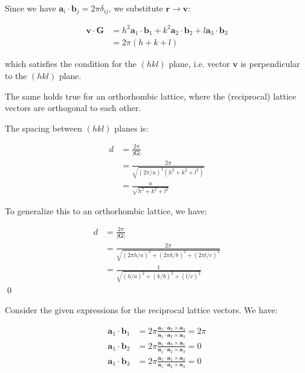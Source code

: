 \documentclass[12pt]{article}
\begin{document}
Since we have $\mathbf{a}_{i} \cdot \mathbf{b}_{j} = 2\pi \delta_{ij}$, we substitute $\mathbf{r} \to \mathbf{v}$:

\begin{equation}
    \begin{split}
        \mathbf{v} \cdot \mathbf{G} & = h^{2} \mathbf{a}_{1} \cdot \mathbf{b}_{1} + k^{2} \mathbf{a}_{2} \cdot \mathbf{b}_{2} + l \mathbf{a}_{3} \cdot \mathbf{b}_{3} \\
        & = 2\pi (h + k + l)
    \end{split}
\end{equation}

which satisfies the condition for the $(hkl)$ plane, i.e. vector $\mathbf{v}$ is perpendicular to the $(hkl)$ plane.

The same holds true for an orthorhombic lattice, where the (reciprocal) lattice vectors are orthogonal to each other.

The spacing between $(hkl)$ planes is:

\begin{equation}
    \begin{split}
        d &= \frac{2\pi}{\left\lvert \mathbf{G} \right\rvert} \\
        &= \frac{2\pi}{\sqrt{(2\pi/a)^{2} (h^{2} + k^{2} + l^{2})}} \\
        &= \frac{a}{\sqrt{h^{2} + k^{2} + l^{2}}}
    \end{split}
\end{equation}

To generalize this to an orthorhombic lattice, we have:

\begin{equation}
    \begin{split}
        d &= \frac{2\pi}{\left\lvert \mathbf{G} \right\rvert} \\
        &= \frac{2\pi}{\sqrt{(2\pi h/a)^{2} + (2\pi k/b)^{2} + (2\pi l/c)^{2}}} \\
        &= \frac{1}{\sqrt{(h/a)^{2} + (k/b)^{2} + (l/c)^{2}}}
    \end{split}
\end{equation}
\qed




Consider the given expressions for the reciprocal lattice vectors. We have:

\begin{equation}
    \begin{split}
        \mathbf{a}_{1} \cdot \mathbf{b}_{1} & = 2\pi \frac{\mathbf{a}_{1} \cdot \mathbf{a}_{2} \times \mathbf{a}_{3}}{\mathbf{a}_{1} \cdot \mathbf{a}_{2} \times \mathbf{a}_{3}} = 2\pi \\
        \mathbf{a}_{1} \cdot \mathbf{b}_{2} & = 2\pi \frac{\mathbf{a}_{1} \cdot \mathbf{a}_{3} \times \mathbf{a}_{1}}{\mathbf{a}_{1} \cdot \mathbf{a}_{2} \times \mathbf{a}_{3}} = 0 \\
        \mathbf{a}_{1} \cdot \mathbf{b}_{3} & = 2\pi \frac{\mathbf{a}_{1} \cdot \mathbf{a}_{1} \times \mathbf{a}_{2}}{\mathbf{a}_{1} \cdot \mathbf{a}_{2} \times \mathbf{a}_{3}} = 0
    \end{split}
\end{equation}
\end{document}
